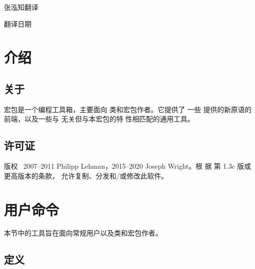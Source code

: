 \documentclass{ltxdockit}[2010/09/26]
\begin{document}
\printtitlepage
\centerline{\heiti 张泓知\qquad 翻译\hspace*{1em}}
\centerline{\heiti\hspace*{40pt} 翻译日期\qquad \zhtoday}
\tableofcontents

\section{介绍}
\label{int}

\subsection[关于]{关于 }

 宏包是一个编程工具箱，主要面向 \latex 类和宏包作者。它提供了
一些 \etex 提供的新原语的 \latex 前端，以及一些与 \etex 无关但与本宏包的特
性相匹配的通用工具。

\subsection{许可证}

版权 \textcopyright\ 2007--2011 Philipp Lehman，2015--2020 Joseph Wright。根
据 \lppl {} 第 1.3c 版或更高版本的条款，
允许复制、分发和/或修改此软件。


\section{用户命令}
\label{use}

本节中的工具旨在面向常规用户以及类和宏包作者。

\subsection{定义}
\label{use:def}
\end{document}
